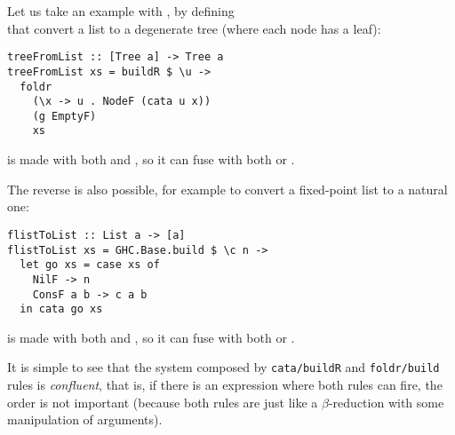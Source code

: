 Let us take an example with , by defining\\  that convert a list to a degenerate tree (where each node has a leaf):
\begin{verbatim}
treeFromList :: [Tree a] -> Tree a
treeFromList xs = buildR $ \u ->
  foldr
    (\x -> u . NodeF (cata u x))
    (g EmptyF)
    xs
\end{verbatim}
\noindent {} is made with both  and , so it can fuse with both  or .

The reverse is also possible, for example to convert a fixed-point list to a natural one:
\begin{verbatim}
flistToList :: List a -> [a]
flistToList xs = GHC.Base.build $ \c n ->
  let go xs = case xs of
    NilF -> n
    ConsF a b -> c a b
  in cata go xs
\end{verbatim}
\noindent {} is made with both  and , so it can fuse with both  or .

It is simple to see that the system composed by \verb|cata/buildR| and \verb|foldr/build| rules is \emph{confluent}, that is, if there is an expression where both rules can fire, the order is not important (because both rules are just like a $\beta$-reduction with some manipulation of arguments).